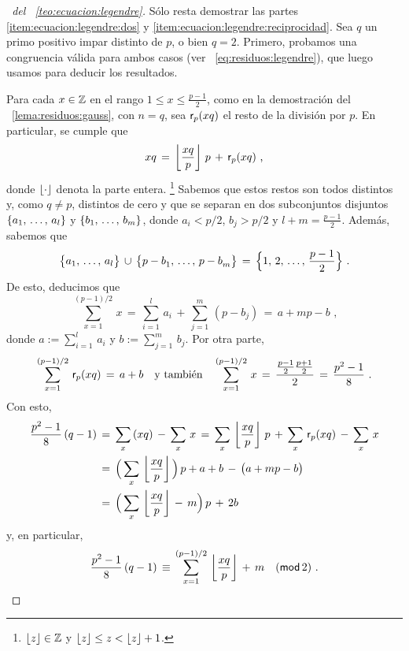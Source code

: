 \begin{proof}[\proofname~del \teoname~\ref{teo:ecuacion:legendre}]
	S\'olo resta demostrar las partes \eqref{item:ecuacion:legendre:dos}
	y \eqref{item:ecuacion:legendre:reciprocidad}. Sea $q$ un primo
	positivo impar distinto de $p$, o bien $q=2$.
	Primero, probamos una congruencia v\'alida para ambos casos (ver~%
	\eqref{eq:residuos:legendre}), que luego usamos para deducir los
	resultados.

	Para cada $x\in\Enteros$ en el rango $1\leq x\leq \frac{p-1} 2$,
	como en la demostraci\'on del \lemaname~\ref{lema:residuos:gauss},
	con $n=q$, sea $\resto[p](xq)$ el resto de la divisi\'on por $p$.
	En particular, se cumple que
	\begin{displaymath}
		xq\,=\,\piso{\frac{xq} p}\,p\,+\,\resto[p](xq)
		\text{ ,}
	\end{displaymath}
	donde $\piso{\cdot}$ denota la parte entera.%
	\footnote{
		$\piso z\in\Enteros$ y $\piso z\leq z<\piso z+1$.
	}
	Sabemos que estos restos son todos distintos y, como $q\neq p$,
	distintos de cero y que se separan en dos subconjuntos disjuntos
	$\{\lista a l\}$ y $\{\lista b m\}$, donde $a_i<p/2$, $b_j>p/2$ y
	$l+m=\frac{p-1} 2$. Adem\'as, sabemos que
	\begin{displaymath}
		\big\{\lista a l\big\}\,\cup\,\big\{\lista{p-b} m\big\}\,=\,
			\Big\{1,\,2,\,\dots,\,\frac{p-1} 2\Big\}
		\text{ .}
	\end{displaymath}
	De esto, deducimos que
	\begin{displaymath}
		\sum_{x=1}^{(p-1)/2}\,x\,=\,\sum_{i=1}^l\,a_i\,+\,
			\sum_{j=1}^m\,(p-b_j)\,=\,a+mp-b
		\text{ ,}
	\end{displaymath}
	donde $a:=\sum_{i=1}^l\,a_i$ y $b:=\sum_{j=1}^m\,b_j$.
	Por otra parte,
	\begin{displaymath}
		\sum_{x=1}^{(p-1)/2}\,\resto[p](xq)\,=\,a+b
		\quad\text{y tambi\'en}\quad
		\sum_{x=1}^{(p-1)/2}\,x\,=\,
			\frac{\frac{p-1} 2\frac{p+1} 2} 2
			\,=\,\frac{p^2-1} 8
		\text{ .}
	\end{displaymath}
	Con esto,
	\begin{displaymath}
		\begin{aligned}
			\frac{p^2-1} 8\,(q-1) & \,=\,
				\sum_x\,(xq)\,-\,\sum_x\,x\,=\,
				\sum_x\,\piso{\frac{xq} p}\,p\,+\,
					\sum_x\,\resto[p](xq)
				\,-\,\sum_x\,x \\
			& \,=\,\Big(\sum_x\,\piso{\frac{xq} p}\Big)\,p+a+b
				\,-\,\big(a+mp-b\big) \\
			& \,=\,\Big(\sum_x\,\piso{\frac{xq} p}\,-\,m\Big)\,p
				\,+\,2b
		\end{aligned}
	\end{displaymath}
	y, en particular,
	\begin{equation}
		\label{eq:residuos:legendre}
		\frac{p^2-1} 8\,(q-1)\,\equiv\,\sum_{x=1}^{(p-1)/2}\,
			\piso{\frac{xq} p}\,+\,m
			\modulo[2]
		\text{ .}
	\end{equation}


\end{proof}
